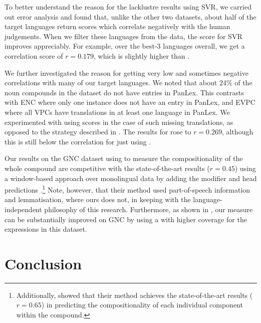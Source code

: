 \documentclass[output=paper
,modfonts
,nonflat]{langsci/langscibook}
\begin{document}
To better understand the reason for the lacklustre results using SVR, we
carried out error analysis and found that, unlike the other two
datasets, about half of the target languages return scores which
correlate negatively with the human judgements. When we filter these
languages from the data, the score for SVR improves appreciably. For
example, over the best-3 languages overall, we get a correlation score
of $r = 0.179$, which is slightly higher than \CSsourcetarg.

We further investigated the reason for getting very low and sometimes
negative correlations with many of our target languages. We noted that
about 24\% of the  noun compounds in the dataset do not have
entries in PanLex. This contrasts with ENC where only one instance
does not have an entry in PanLex, and EVPC where all VPCs have
translations in at least one language in PanLex. We experimented with
using  scores in the case of such missing
translations, as opposed to the strategy described in
. The results for \CSsvr rose to $r =
0.269$, although this is still below the correlation for just using
.

Our results on the GNC dataset using  to measure the
compositionality of the whole compound are competitive with the
state-of-the-art results ($r = 0.45$) using a window-based
 approach over monolingual  data by
adding the modifier and head predictions
\citep{SchulteImWalde+:2013}.\footnote{Additionally,
  \cite{SchulteImWalde+:2013} showed that their method achieves the
  state-of-the-art results ($r = 0.65$) in predicting the
  compositionality of each individual component within the compound.}
Note, however, that their method used part-of-speech information and
lemmatisation, where ours does not, in keeping with the
language-independent philosophy of this research. Furthermore, as
shown in , our  measure can be
substantially improved on GNC by using a  with
higher coverage for the expressions in this dataset.





\section{Conclusion}
\end{document}
